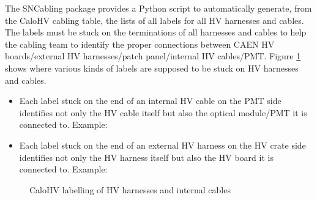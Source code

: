 The  SNCabling  package  provides  a Python  script  to  automatically
generate, from the  CaloHV cabling table, the lists of  all labels for
all  HV  harnesses and  cables.   The  labels  must  be stuck  on  the
terminations of all  harnesses and cables to help the  cabling team to
identify  the proper  connections between  CAEN HV  boards/external HV
harnesses/patch     panel/internal      HV     cables/PMT.      Figure
\ref{fig:calohv:labels:1}  shows where  various  kinds  of labels  are
supposed to be stuck on HV harnesses and cables.

\begin{itemize}
\item Each label  stuck on the end of an  internal HV cable on
the PMT  side identifies  not only  the HV cable  itself but  also the
optical module/PMT it is connected to. Example:
  \begin{center}
  \end{center}
\item Each label  stuck on the end of an  external HV harness on
the HV crate  side identifies  not only  the HV harness  itself but  also the
HV board it is connected to. Example:
  \begin{center}
  \end{center}
\end{itemize}

\begin{figure}[h!]
  \begin{center}
    \scalebox{0.75}{}
  \end{center}
  \caption{CaloHV labelling of HV harnesses and internal cables}
  \label{fig:calohv:labels:1}
\end{figure}

